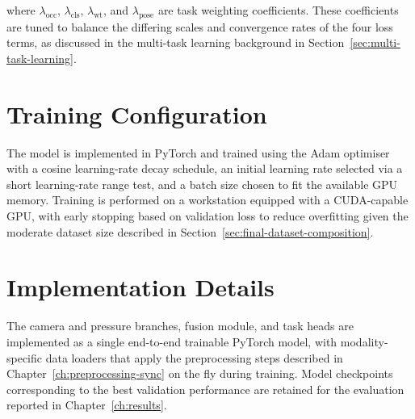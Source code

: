 \noindent where $\lambda_{\text{occ}}$, $\lambda_{\text{cls}}$,
$\lambda_{\text{wt}}$, and $\lambda_{\text{pose}}$ are task weighting
coefficients. These coefficients are tuned to balance the differing
scales and convergence rates of the four loss terms, as discussed in the
multi-task learning background in Section~\ref{sec:multi-task-learning}.

\section{Training Configuration}
\label{sec:training-configuration}
The model is implemented in PyTorch and trained using the Adam optimiser
with a cosine learning-rate decay schedule, an initial learning rate
selected via a short learning-rate range test, and a batch size chosen to
fit the available GPU memory. Training is performed on a workstation
equipped with a CUDA-capable GPU, with early stopping based on validation
loss to reduce overfitting given the moderate dataset size described in
Section~\ref{sec:final-dataset-composition}.

\section{Implementation Details}
\label{sec:implementation-details}
The camera and pressure branches, fusion module, and task heads are
implemented as a single end-to-end trainable PyTorch model, with
modality-specific data loaders that apply the preprocessing steps
described in Chapter~\ref{ch:preprocessing-sync} on the fly during
training. Model checkpoints corresponding to the best validation
performance are retained for the evaluation reported in
Chapter~\ref{ch:results}.
